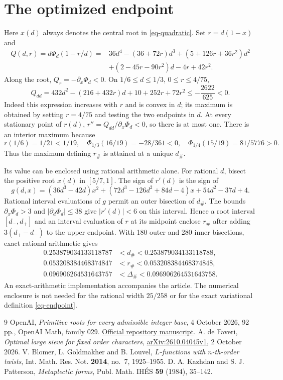 \documentclass[11pt,a4paper]{article}
\numberwithin{equation}{section}
\theoremstyle{remark}
\begin{document}
\appendix
\section{The optimized endpoint}

Here $x(d)$ always denotes the central root in \eqref{eq-quadratic}.
Set $r=d(1-x)$ and
\begin{align*}
 Q(d,r)=d\Phi_d(1-r/d)
 ={}&36d^4-(36+72r)d^3+(5+126r+36r^2)d^2\\
 &+(2-45r-90r^2)d-4r+42r^2.
\end{align*}
Along the root, $Q_r=-\partial_x\Phi_d<0$.
On $1/6\le d\le1/3$, $0\le r\le4/75$,
\[
 Q_{dd}=432d^2-(216+432r)d+10+252r+72r^2
 \le-\frac{2622}{625}<0.
\]
Indeed this expression increases with $r$ and is convex in $d$;
its maximum is obtained by setting $r=4/75$ and testing the two
endpoints in $d$.  At every stationary point of $r(d)$,
$r''=Q_{dd}/\partial_x\Phi_d<0$, so there is at most one.
There is an interior maximum because
\[
 r(1/6)=1/21<1/19,\quad
 \Phi_{1/3}(16/19)=-28/361<0,\quad
 \Phi_{1/4}(15/19)=81/5776>0.
\]
Thus the maximum defining $r_\#$ is attained at a unique $d_\#$.

Its value can be enclosed using rational arithmetic alone.
For rational $d$, bisect the positive root $x(d)$ in $[5/7,1]$.
The sign of $r'(d)$ is the sign of
\[
 g(d,x)=(36d^3-42d)x^2
 +(72d^3-126d^2+84d-4)x+54d^2-37d+4.
\]
Rational interval evaluations of $g$ permit an outer bisection
of $d_\#$.  The bounds $\partial_x\Phi_d>3$ and
$|\partial_d\Phi_d|\le38$ give $|r'(d)|<6$ on this interval.
Hence a root interval $[d_-,d_+]$ and an interval evaluation of
$r$ at its midpoint enclose $r_\#$ after adding
$3(d_+-d_-)$ to the upper endpoint.  With 180 outer and 280
inner bisections, exact rational arithmetic gives
\begin{align*}
 0.253879034133118787&<d_\#<0.253879034133118788,\\
 0.053208384468374847&<r_\#<0.053208384468374848,\\
 0.096906264531643757&<\Delta_\#<0.096906264531643758.
\end{align*}
An exact-arithmetic implementation accompanies the article.
The numerical enclosure is not needed for the rational width
$25/258$ or for the exact variational definition \eqref{eq-endpoint}.

\begin{thebibliography}{9}
OpenAI, \emph{Primitive roots for every admissible integer base},
4 October 2026, 92 pp., OpenAI Math, family 029.
\href{https://github.com/openai/math/blob/main/preprints/Primitive-roots-for-every-admissible-integer-base-October-4-2026/primitive-roots-all-integer-bases.pdf}{Official repository manuscript}.
A. de Faveri, \emph{Optimal large sieve for fixed order characters},
\href{https://arxiv.org/abs/2610.04045}{arXiv:2610.04045v1},
2 October 2026.
V. Blomer, L. Goldmakher and B. Louvel,
\emph{$L$-functions with $n$-th-order twists},
Int. Math. Res. Not. \textbf{2014}, no.~7, 1925--1955.
D. A. Kazhdan and S. J. Patterson, \emph{Metaplectic forms},
Publ. Math. IH\'ES \textbf{59} (1984), 35--142.
\end{thebibliography}
\end{document}
